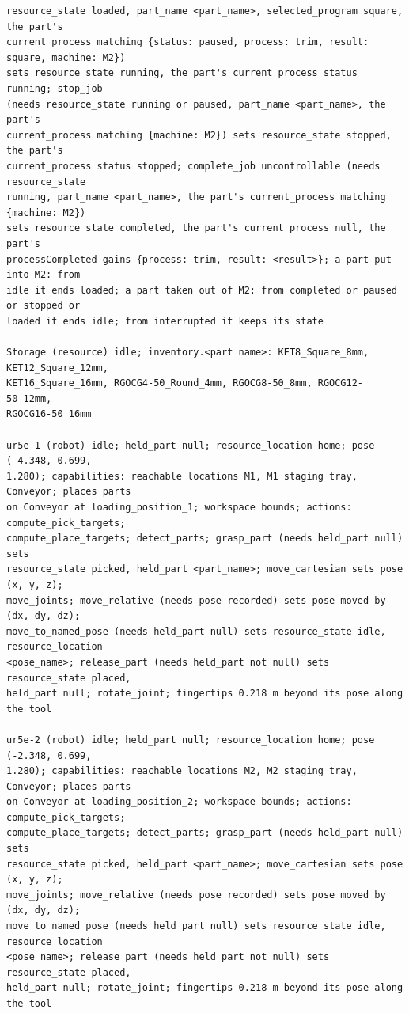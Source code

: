 \documentclass[preprint,12pt,authoryear]{elsarticle}
\begin{document}
\begin{lstlisting}[style=recorded]
resource_state loaded, part_name <part_name>, selected_program square, the part's
current_process matching {status: paused, process: trim, result: square, machine: M2})
sets resource_state running, the part's current_process status running; stop_job
(needs resource_state running or paused, part_name <part_name>, the part's
current_process matching {machine: M2}) sets resource_state stopped, the part's
current_process status stopped; complete_job uncontrollable (needs resource_state
running, part_name <part_name>, the part's current_process matching {machine: M2})
sets resource_state completed, the part's current_process null, the part's
processCompleted gains {process: trim, result: <result>}; a part put into M2: from
idle it ends loaded; a part taken out of M2: from completed or paused or stopped or
loaded it ends idle; from interrupted it keeps its state

Storage (resource) idle; inventory.<part name>: KET8_Square_8mm, KET12_Square_12mm,
KET16_Square_16mm, RGOCG4-50_Round_4mm, RGOCG8-50_8mm, RGOCG12-50_12mm,
RGOCG16-50_16mm

ur5e-1 (robot) idle; held_part null; resource_location home; pose (-4.348, 0.699,
1.280); capabilities: reachable locations M1, M1 staging tray, Conveyor; places parts
on Conveyor at loading_position_1; workspace bounds; actions: compute_pick_targets;
compute_place_targets; detect_parts; grasp_part (needs held_part null) sets
resource_state picked, held_part <part_name>; move_cartesian sets pose (x, y, z);
move_joints; move_relative (needs pose recorded) sets pose moved by (dx, dy, dz);
move_to_named_pose (needs held_part null) sets resource_state idle, resource_location
<pose_name>; release_part (needs held_part not null) sets resource_state placed,
held_part null; rotate_joint; fingertips 0.218 m beyond its pose along the tool

ur5e-2 (robot) idle; held_part null; resource_location home; pose (-2.348, 0.699,
1.280); capabilities: reachable locations M2, M2 staging tray, Conveyor; places parts
on Conveyor at loading_position_2; workspace bounds; actions: compute_pick_targets;
compute_place_targets; detect_parts; grasp_part (needs held_part null) sets
resource_state picked, held_part <part_name>; move_cartesian sets pose (x, y, z);
move_joints; move_relative (needs pose recorded) sets pose moved by (dx, dy, dz);
move_to_named_pose (needs held_part null) sets resource_state idle, resource_location
<pose_name>; release_part (needs held_part not null) sets resource_state placed,
held_part null; rotate_joint; fingertips 0.218 m beyond its pose along the tool


\end{lstlisting}
\end{document}
